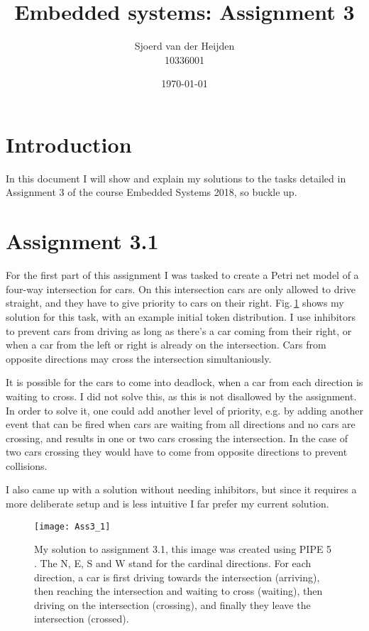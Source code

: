 \documentclass{article}
\title{Embedded systems: Assignment 3}
\date{\today}
\author{Sjoerd van der Heijden \\ 10336001}
\begin{document}
	\maketitle
	\tableofcontents
	\section{Introduction}
	\par In this document I will show and explain my solutions to the tasks detailed in Assignment 3 of the course Embedded Systems 2018, so buckle up.
	
	\section{Assignment 3.1}
	\par For the first part of this assignment I was tasked to create a Petri net model of a four-way intersection for cars. On this intersection cars are only allowed to drive straight, and they have to give priority to cars on their right. 	Fig.\,\ref{fig:ass3_1} shows my solution for this task, with an example initial token distribution. I use inhibitors to prevent cars from driving as long as there's a car coming from their right, or when a car from the left or right is already on the intersection. Cars from opposite directions may cross the intersection simultaniously.
	\par It is possible for the cars to come into deadlock, when a car from each direction is waiting to cross. I did not solve this, as this is not disallowed by the assignment. In order to solve it, one could add another level of priority, e.g. by adding another event that can be fired when cars are waiting from all directions and no cars are crossing, and results in one or two cars crossing the intersection. In the case of two cars crossing they would have to come from opposite directions to prevent collisions.
	\par I also came up with a solution without needing inhibitors, but since it requires a more deliberate setup and is less intuitive I far prefer my current solution.
	
	\begin{figure}
		\centering
		\texttt{[image: Ass3\_1]}
		\caption{My solution to assignment 3.1, this image was created using PIPE 5 \cite{dingle2009pipe2, bonet2007pipe}. The N, E, S and W stand for the cardinal directions. For each direction, a car is first driving towards the intersection (arriving), then reaching the intersection and waiting to cross (waiting), then driving on the intersection (crossing), and finally they leave the intersection (crossed). \label{fig:ass3_1}}
	\end{figure}
	
\end{document}
